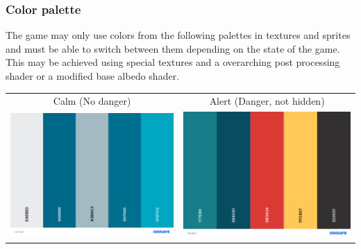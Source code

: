 \documentclass[10pt,a4paper]{article}
\begin{document}
\subsubsection{Color palette}
The game may only use colors from the following palettes in textures and sprites and must be able to switch between them depending on the state of the game. \\
This may be achieved using special textures and a overarching post processing shader or a modified base albedo shader.\\
\begin{tabular}{c c}

Calm (No danger) & Alert (Danger, not hidden)\\
\includegraphics[scale=0.1]{normal} & \includegraphics[scale=0.1]{danger}\\

\end{tabular}
\end{document}
